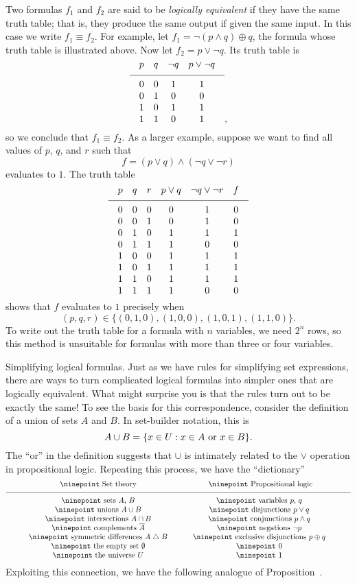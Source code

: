 Two formulas $f_1$ and $f_2$ are said to be {\it logically equivalent} if they have the same truth table;
that is, they produce the same output if given the same input. In this case we write $f_1 \equiv f_2$.
For example, let $f_1 = \neg(p\wedge q) \oplus q$, the formula whose truth table is illustrated above.
Now let $f_2 = p \vee \neg q$. Its truth table is
$$
\vbox{
\tabskip=1em plus.2em minus .2em
\halign{
\hfil$#$\hfil & \hfil$#$\hfil & \hfil$#$\hfil & \hfil$#$\hfil \cr
p & q & \neg q & p\vee \neg q \cr
\noalign{\medskip}
\noalign{\hrule}
\noalign{\medskip}
0 & 0 & 1 & 1 \cr
0 & 1 & 0 & 0 \cr
1 & 0 & 1 & 1 \cr
1 & 1 & 0 & 1 \cr
}},
$$
so we conclude that $f_1 \equiv f_2$. As a larger example, suppose we want to find all
values of $p$, $q$, and $r$ such that
$$ f = (p\vee q)\wedge (\neg q \vee \neg r)$$
evaluates to $1$. The truth table
$$
\vbox{
\tabskip=1em plus.2em minus .2em
\halign{
\hfil$#$\hfil & \hfil$#$\hfil & \hfil$#$\hfil & \hfil$#$\hfil &
\hfil$#$\hfil & \hfil$#$\hfil  \cr
p & q & r & p\vee q & \neg q \vee \neg r & f \cr
\noalign{\medskip}
\noalign{\hrule}
\noalign{\medskip}
0 & 0 & 0 & 0 & 1 & 0 \cr
0 & 0 & 1 & 0 & 1 & 0 \cr
0 & 1 & 0 & 1 & 1 & 1 \cr
0 & 1 & 1 & 1 & 0 & 0 \cr
1 & 0 & 0 & 1 & 1 & 1 \cr
1 & 0 & 1 & 1 & 1 & 1 \cr
1 & 1 & 0 & 1 & 1 & 1 \cr
1 & 1 & 1 & 1 & 0 & 0 \cr
}}
$$
shows that $f$ evaluates to $1$ precisely when
$$(p,q,r) \in \bigl\{(0,1,0), (1,0,0), (1,0,1), (1,1,0)\bigr\}.$$
To write out the truth table for a formula with $n$ variables, we need $2^n$ rows, so this
method is unsuitable for formulas with more than three or four variables.

\medskip\boldlabel Simplifying logical formulas. Just as we have rules for simplifying set expressions,
there are ways to turn complicated logical formulas into simpler ones that are logically equivalent.
What might surprise you is that the rules turn out to be exactly the same! To see the basis for this
correspondence, consider the definition of a union of sets $A$ and $B$. In set-builder notation,
this is
$$A \cup B = \{ x\in U : x\in A\ \hbox{or}\ x\in B\}.$$
The ``or'' in the definition suggests that $\cup$ is intimately related to the $\vee$ operation in
propositional logic. Repeating this process, we have the ``dictionary''
$$
\vbox{
\tabskip=3em plus.005em minus .005em
\halign{
\hfil{\ninepoint #}\hfil & \hfil{\ninepoint #}\hfil \cr
Set theory & Propositional logic\cr
\noalign{\medskip}
\noalign{\hrule}
\noalign{\medskip}
sets $A$, $B$ & variables $p$, $q$ \cr
unions $A\cup B$ & disjunctions $p\vee q$ \cr
intersections $A\cap B$ & conjunctions $p\wedge q$ \cr
complements $\bar A$ & negations $\neg p$ \cr
symmetric differences $A\symdiff B$ & exclusive disjunctions $p\oplus q$ \cr
the empty set $\emptyset$ & $0$ \cr
the universe $U$ & $1$ \cr
}}
$$
Exploiting this connection, we have the following analogue of Proposition~{\propsetlaws}.

